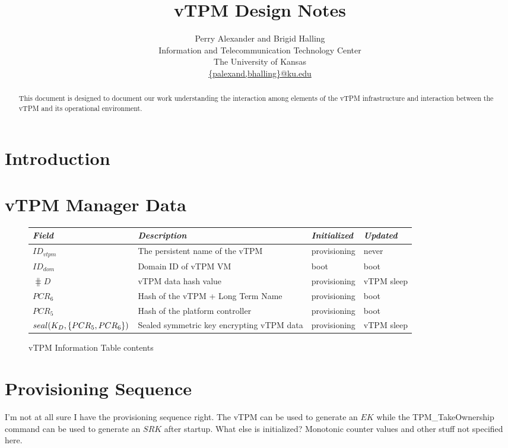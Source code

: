 \documentclass[10pt]{article}
\title{vTPM Design Notes}
\author{Perry Alexander and Brigid Halling \\ Information and
  Telecommunication Technology Center \\
  The University of Kansas \\
  \url{{palexand,bhalling}@ku.edu}}
\begin{document}
\maketitle
\tableofcontents
\listoffigures
\listoftables

\begin{abstract}
  This document is designed to document our work understanding the
  interaction among elements of the vTPM infrastructure and
  interaction between the vTPM and its operational environment.
\end{abstract}

\section{Introduction}

\section{vTPM Manager Data}

\begin{figure}[hbtp]
  \centering
  \begin{tabular}{llll}
    \emph{Field} & \emph{Description} & \emph{Initialized} &
    \emph{Updated} \\ \hline
    $ID_{vtpm}$ & The persistent name of the vTPM & provisioning &
    never \\
    $ID_{dom}$ & Domain ID of vTPM VM & boot & boot \\
    $\hash{D}$ & vTPM data hash value & provisioning & vTPM sleep \\
    $PCR_6$ & Hash of the vTPM + Long Term Name & provisioning & boot
    \\
    $PCR_5$ & Hash of the platform controller & provisioning & boot \\
    $seal(K_D,\{PCR_5,PCR_6\})$ & Sealed symmetric key encrypting vTPM data &
    provisioning & vTPM sleep \\

  \end{tabular}
  \caption{vTPM Information Table contents}
  \label{fig:vtpm-information-table-format}
\end{figure}

\section{Provisioning Sequence}

I'm not at all sure I have the provisioning sequence right.  The vTPM
can be used to generate an $EK$ while the \textsf{TPM\_TakeOwnership}
command can be used to generate an $SRK$ after startup.  What else is
initialized?  Monotonic counter values and other stuff not specified here.
\end{document}
